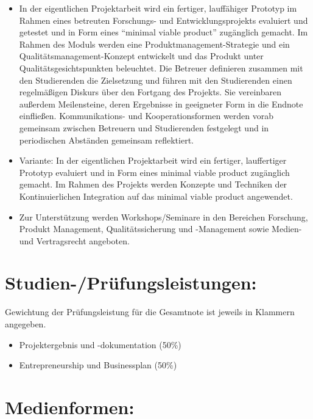 \begin{itemize}
\tightlist
\item
  In der eigentlichen Projektarbeit wird ein fertiger, lauffähiger
  Prototyp im Rahmen eines betreuten Forschungs- und
  Entwicklungsprojekts evaluiert und getestet und in Form eines
  ``minimal viable product'' zugänglich gemacht. Im Rahmen des Moduls
  werden eine Produktmanagement-Strategie und ein
  Qualitätsmanagement-Konzept entwickelt und das Produkt unter
  Qualitätsgesichtspunkten beleuchtet. Die Betreuer definieren zusammen
  mit den Studierenden die Zielsetzung und führen mit den Studierenden
  einen regelmäßigen Diskurs über den Fortgang des Projekts. Sie
  vereinbaren außerdem Meilensteine, deren Ergebnisse in geeigneter Form
  in die Endnote einfließen. Kommunikations- und Kooperationsformen
  werden vorab gemeinsam zwischen Betreuern und Studierenden festgelegt
  und in periodischen Abständen gemeinsam reflektiert.
\item
  Variante: In der eigentlichen Projektarbeit wird ein fertiger,
  lauffertiger Prototyp evaluiert und in Form eines minimal viable
  product zugänglich gemacht. Im Rahmen des Projekts werden Konzepte und
  Techniken der Kontinuierlichen Integration auf das minimal viable
  product angewendet.
\item
  Zur Unterstützung werden Workshops/Seminare in den Bereichen
  Forschung, Produkt Management, Qualitätssicherung und -Management
  sowie Medien- und Vertragsrecht angeboten.
\end{itemize}

\section*{Studien-/Prüfungsleistungen:\label{/mi-2017/modulbeschreibungen-master/MA_Modul_Projekt_Verwertung}}\label{studien-pruxfcfungsleistungenpathlabelmi-2017modulbeschreibungen-mastermaux5fmodulux5fprojektux5fverwertung}

Gewichtung der Prüfungsleistung für die Gesamtnote ist jeweils in
Klammern angegeben.

\begin{itemize}
\tightlist
\item
  Projektergebnis und -dokumentation (50\%)
\item
  Entrepreneurship und Businessplan (50\%)
\end{itemize}

\section*{Medienformen:\label{/mi-2017/modulbeschreibungen-master/MA_Modul_Projekt_Verwertung}}\label{medienformenpathlabelmi-2017modulbeschreibungen-mastermaux5fmodulux5fprojektux5fverwertung}

